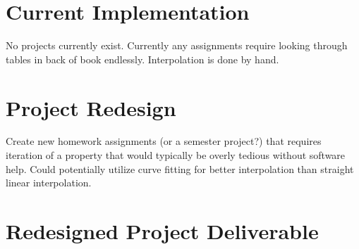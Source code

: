 \section{Current Implementation}
No projects currently exist. Currently any assignments require 
looking through tables in back of book endlessly. Interpolation is 
done by hand.

\section{Project Redesign}
Create new homework assignments (or a semester project?) that requires iteration of a property that would typically be overly tedious without software help. Could potentially utilize curve fitting for better interpolation than straight linear interpolation.

\section{Redesigned Project Deliverable}
